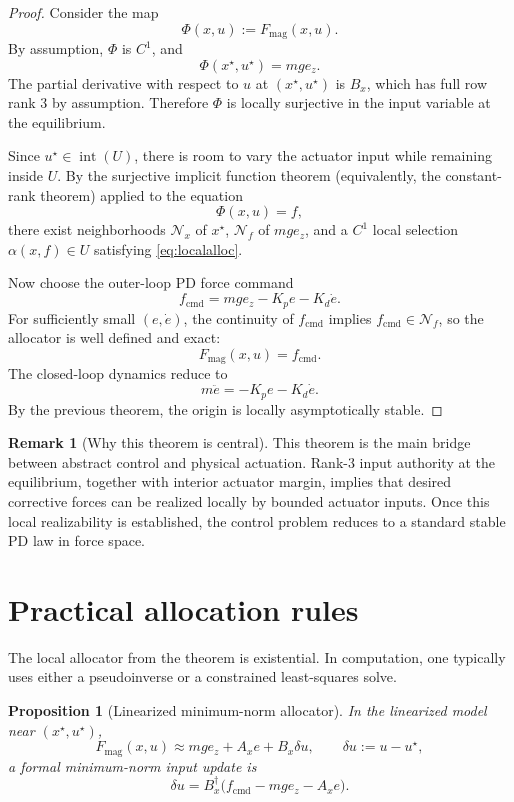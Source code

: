 \documentclass[11pt]{article}
\newtheorem{proposition}{Proposition}
\theoremstyle{definition}
\newtheorem{remark}{Remark}
\begin{document}
\begin{proof}
Consider the map
\[
\Phi(x,u) := F_{\mathrm{mag}}(x,u).
\]
By assumption, $\Phi$ is $C^1$, and
\[
\Phi(x^\star,u^\star)=mg e_z.
\]
The partial derivative with respect to $u$ at $(x^\star,u^\star)$ is $B_x$, which has full row rank $3$ by assumption. Therefore $\Phi$ is locally surjective in the input variable at the equilibrium.

Since $u^\star \in \operatorname{int}(U)$, there is room to vary the actuator input while remaining inside $U$. By the surjective implicit function theorem (equivalently, the constant-rank theorem) applied to the equation
\[
\Phi(x,u)=f,
\]
there exist neighborhoods $\mathcal N_x$ of $x^\star$, $\mathcal N_f$ of $mg e_z$, and a $C^1$ local selection $\alpha(x,f) \in U$ satisfying \eqref{eq:localalloc}.

Now choose the outer-loop PD force command
\[
f_{\mathrm{cmd}} = mg e_z - K_p e - K_d \dot e.
\]
For sufficiently small $(e,\dot e)$, the continuity of $f_{\mathrm{cmd}}$ implies $f_{\mathrm{cmd}} \in \mathcal N_f$, so the allocator is well defined and exact:
\[
F_{\mathrm{mag}}(x,u)=f_{\mathrm{cmd}}.
\]
The closed-loop dynamics reduce to
\[
 m\ddot e = -K_p e - K_d \dot e.
\]
By the previous theorem, the origin is locally asymptotically stable.
\end{proof}

\begin{remark}[Why this theorem is central]
This theorem is the main bridge between abstract control and physical actuation. Rank-$3$ input authority at the equilibrium, together with interior actuator margin, implies that desired corrective forces can be realized locally by bounded actuator inputs. Once this local realizability is established, the control problem reduces to a standard stable PD law in force space.
\end{remark}

\section{Practical allocation rules}

The local allocator from the theorem is existential. In computation, one typically uses either a pseudoinverse or a constrained least-squares solve.

\begin{proposition}[Linearized minimum-norm allocator]
In the linearized model near $(x^\star,u^\star)$,
\[
F_{\mathrm{mag}}(x,u) \approx mg e_z + A_x e + B_x \delta u,
\qquad
\delta u := u-u^\star,
\]
a formal minimum-norm input update is
\begin{equation}
\delta u = B_x^\dagger\bigl(f_{\mathrm{cmd}} - mg e_z - A_x e\bigr).
\label{eq:pseudoinverse}
\end{equation}
\end{proposition}
\end{document}
